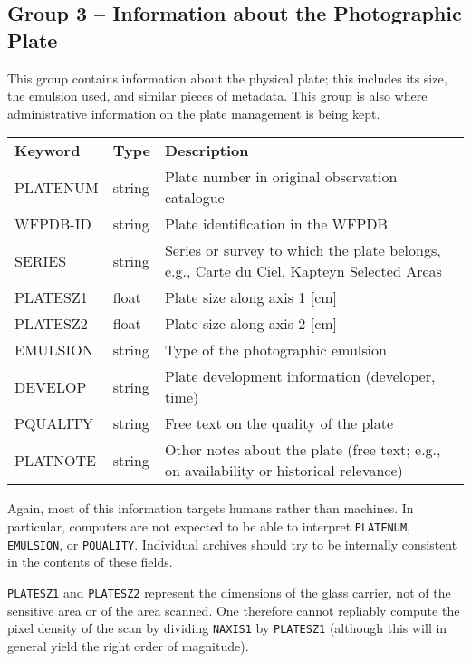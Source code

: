 \documentclass[11pt]{ivoa}
\newcommand\cardname[1]{\texttt{\color{keyword}#1}}
\begin{document}
\subsection{Group 3 – Information about the Photographic Plate}

This group contains information about the physical plate; this includes
its size, the emulsion used, and similar pieces of metadata.  This group
is also where administrative information on the plate management is
being kept.

\begin{inlinetable}
\footnotesize
\begin{tabular}{llp{}}
\sptablerule
\textbf{Keyword}&\textbf{Type}&\textbf{Description}\\
\sptablerule
PLATENUM &string &Plate number in original observation
catalogue\\
WFPDB-ID &string &Plate identification in the WFPDB\\
SERIES   &string &Series or survey to which the plate belongs,
e.g., Carte du Ciel, Kapteyn Selected Areas\\
PLATESZ1 &float  &Plate size along axis 1 [cm]\\
PLATESZ2 &float  &Plate size along axis 2 [cm]\\
EMULSION &string &Type of the photographic emulsion\\
DEVELOP  &string &Plate development information (developer,
time)\\
PQUALITY &string &Free text on the quality of the plate\\
PLATNOTE &string &Other notes about the plate (free text; e.g., on
availability or historical relevance)\\
\end{tabular}
\end{inlinetable}

Again, most of this information targets humans rather than machines.  In
particular, computers are not expected to be able to interpret
\cardname{PLATENUM}, \cardname{EMULSION}, or \cardname{PQUALITY}.
Individual archives should try to be internally consistent in the
contents of these fields.

\cardname{PLATESZ1} and \cardname{PLATESZ2} represent the dimensions of
the glass carrier, not of the sensitive area or of the area scanned.
One therefore cannot repliably compute the pixel density of the scan by
dividing \cardname{NAXIS1} by \cardname{PLATESZ1} (although this will in
general yield the right order of magnitude).
\end{document}
